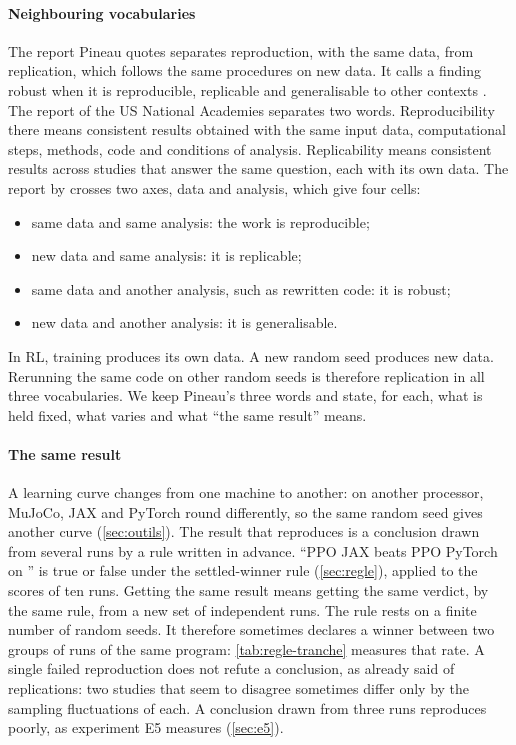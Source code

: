 \paragraph{Neighbouring vocabularies}
The report Pineau quotes separates reproduction, with the same data, from replication, which follows
the same procedures on new data. It calls a finding robust when it is reproducible, replicable and
generalisable to other contexts \parencite[p.~3]{bollen2015robust}. The report of the US National
Academies \parencite[Summary, p.~1]{nasem2019reproducibility} separates two words. Reproducibility there
means consistent results obtained with the same input data, computational steps, methods, code and
conditions of analysis. Replicability means consistent results across studies that answer the same
question, each with its own data. The report by \textcite[Section~2.1, Figure~1]{pineau2021improving}
crosses two axes, data and analysis, which give four cells:
\begin{itemize}
  \item same data and same analysis: the work is reproducible;
  \item new data and same analysis: it is replicable;
  \item same data and another analysis, such as rewritten code: it is robust;
  \item new data and another analysis: it is generalisable.
\end{itemize}
In RL, training produces its own data. A new random seed produces new
data. Rerunning the same code on other random seeds is therefore replication in all three vocabularies.
We keep Pineau's three words and state, for each, what is held fixed, what varies and what \enquote{the
same result} means.

\paragraph{The same result}
A learning curve changes from one machine to another: on another processor, MuJoCo, JAX and PyTorch
round differently, so the same random seed gives another curve (\cref{sec:outils}). The result that
reproduces is a conclusion drawn from several runs by a rule written in advance. \enquote{PPO JAX beats
PPO PyTorch on } is true or false under the settled-winner rule (\cref{sec:regle}),
applied to the scores of ten runs. Getting the same result means getting the same verdict, by the same
rule, from a new set of independent runs. The rule rests on a finite number of random seeds. It
therefore sometimes declares a winner between two groups of runs of the same program: \cref{tab:regle-tranche}
measures that rate. A single failed reproduction does not refute a conclusion, as
\textcite[p.~4]{bollen2015robust} already said of replications: two studies that seem to disagree
sometimes differ only by the sampling fluctuations of each. A conclusion drawn from three runs
reproduces poorly, as experiment E5 measures (\cref{sec:e5}).

